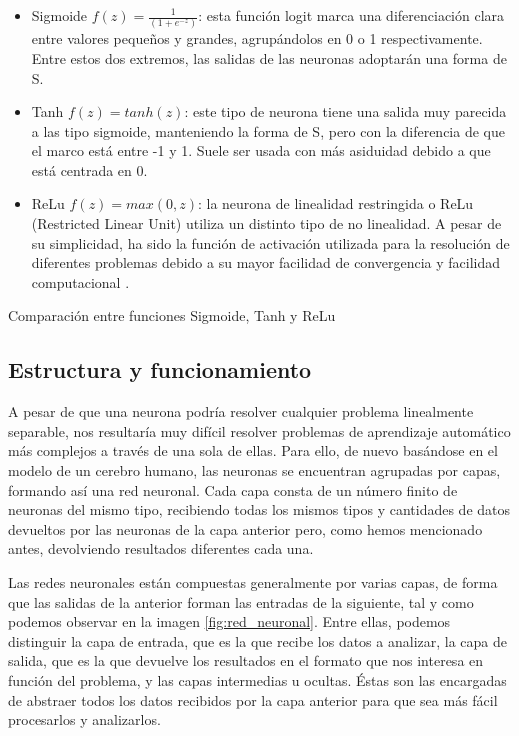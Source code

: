 \begin{itemize}
    \item Sigmoide $f(z) = \frac{1}{(1+e^{-z})}$: esta función logit marca una diferenciación clara entre valores pequeños y grandes, agrupándolos en 0 o 1 respectivamente. Entre estos dos extremos, las salidas de las neuronas adoptarán una forma de S.
    \item Tanh $f(z)= tanh(z)$: este tipo de neurona tiene una salida muy parecida a las tipo sigmoide, manteniendo la forma de S, pero con la diferencia de que el marco está entre -1 y 1. Suele ser usada con más asiduidad debido a que está centrada en 0.
    \item ReLu $f(z) = max(0,z)$: la neurona de linealidad restringida o ReLu (Restricted Linear Unit) utiliza un distinto tipo de no linealidad. A pesar de su simplicidad, ha sido la función de activación utilizada para la resolución de diferentes problemas debido a su mayor facilidad de convergencia y facilidad computacional \citep{Enyinna2018}.
\end{itemize}

%
       {Comparación entre funciones Sigmoide, Tanh y ReLu}

\subsection{Estructura y funcionamiento}
A pesar de que una neurona podría resolver cualquier problema linealmente separable, nos resultaría muy difícil resolver problemas de aprendizaje automático más complejos a través de una sola de ellas. Para ello, de nuevo basándose en el modelo de un cerebro humano, las neuronas se encuentran agrupadas por capas, formando así una red neuronal. Cada capa consta de un número finito de neuronas del mismo tipo, recibiendo todas los mismos tipos y cantidades de datos devueltos por las neuronas de la capa anterior pero, como hemos mencionado antes, devolviendo resultados diferentes cada una.

Las redes neuronales están compuestas generalmente por varias capas, de forma que las salidas de la anterior forman las entradas de la siguiente, tal y como podemos observar en la imagen \ref{fig:red_neuronal}. Entre ellas, podemos distinguir la capa de entrada, que es la que recibe los datos a analizar, la capa de salida, que es la que devuelve los resultados en el formato que nos interesa en función del problema, y las capas intermedias u ocultas. Éstas son las encargadas de abstraer todos los datos recibidos por la capa anterior para que sea más fácil procesarlos y analizarlos. 

